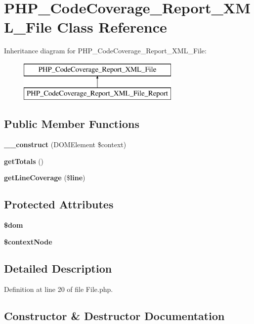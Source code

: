 \section{P\+H\+P\+\_\+\+Code\+Coverage\+\_\+\+Report\+\_\+\+X\+M\+L\+\_\+\+File Class Reference}
\label{class_p_h_p___code_coverage___report___x_m_l___file}
Inheritance diagram for P\+H\+P\+\_\+\+Code\+Coverage\+\_\+\+Report\+\_\+\+X\+M\+L\+\_\+\+File\+:\begin{figure}[H]
\begin{center}
\leavevmode
\includegraphics[height=2.000000cm]{class_p_h_p___code_coverage___report___x_m_l___file}
\end{center}
\end{figure}
\subsection*{Public Member Functions}
\begin{DoxyCompactItemize}
\item 
{\bf \+\_\+\+\_\+construct} (D\+O\+M\+Element \$context)
\item 
{\bf get\+Totals} ()
\item 
{\bf get\+Line\+Coverage} (\${\bf line})
\end{DoxyCompactItemize}
\subsection*{Protected Attributes}
\begin{DoxyCompactItemize}
\item 
{\bf \$dom}
\item 
{\bf \$context\+Node}
\end{DoxyCompactItemize}


\subsection{Detailed Description}


Definition at line 20 of file File.\+php.



\subsection{Constructor \& Destructor Documentation}
